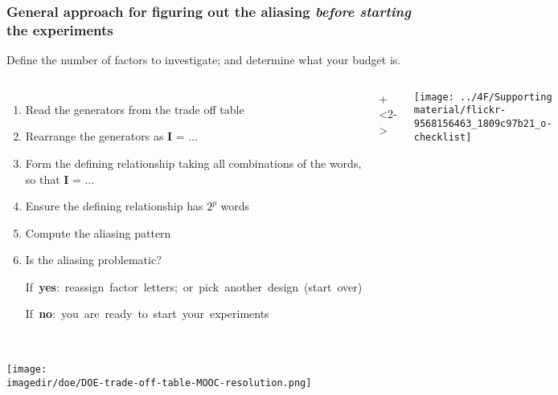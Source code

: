 \begin{frame}\frametitle{General approach for figuring out the aliasing \emph{before starting} the experiments}
	
	\vspace{0.5cm}
	Define the number of factors to investigate; and determine what your budget is.
	
	\vspace{0.5cm}
	\begin{columns}[T]
			\begin{enumerate}
				\item	Read the generators from the trade off table 
				\item	Rearrange the generators as  $\textbf{I = \ldots}$
			 	\item	Form the {\color{purple}defining relationship} taking all combinations of the words, so that $\textbf{I = \ldots}$
			 	\item	Ensure the defining relationship has $2^p$ words
				\item	Compute the aliasing pattern
				\item	{\color{myGreen}Is the aliasing problematic?}
				
					\hbox{\hspace{3.5em}If \textbf{yes}: reassign factor letters; or pick another design (start over)}
					
					\hbox{\hspace{3.5em}If \textbf{no}: you are ready to start your experiments}
			\end{enumerate}
			
			\onslide+<2->{
				\centerline{\texttt{[image: ../4F/Supporting material/flickr-9568156463\_1809c97b21\_o-checklist]}}
			
			}
	\end{columns}

	
\end{frame}

\begin{frame}\frametitle{}
	\vspace{0.5cm}	
		\centerline{\texttt{[image: \\imagedir/doe/DOE-trade-off-table-MOOC-resolution.png]}}	
\end{frame}

